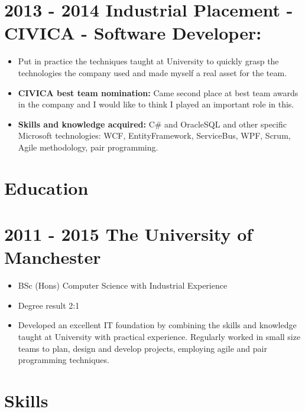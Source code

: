 \documentclass[12pt,a4paper]{res}
\begin{document}
\begin{resume}
\section{\bf 2013 - 2014 \hspace{0.5mm} Industrial Placement - CIVICA - Software Developer:}
\vspace{5mm}    
	\begin{itemize}
	\item[] Put in practice the techniques taught at University to quickly grasp the technologies the company used and made myself a real asset for the team.
	\item{\bf CIVICA best team nomination:} Came second place at best team awards in the company and I would like to think I played an important role in this.
	\item{\bf Skills and knowledge acquired:} C\# and OracleSQL and other specific Microsoft technologies: WCF, EntityFramework, ServiceBus, WPF, Scrum, Agile methodology, pair programming.
	\end{itemize}


\section{\large\bf Education}
\vspace{5mm}

\section{\bf 2011 - 2015 \hspace{1.5mm}The University of Manchester}
  
  \begin{itemize} %
     \item[] BSc (Hons) Computer Science  with Industrial Experience
     \item[] Degree result 2:1

     \item Developed an excellent IT foundation by combining the skills and knowledge taught at University with practical experience. Regularly worked in small size teams to plan, design and develop projects, employing agile and pair programming techniques.
   \end{itemize}

\newpage 
	
\section{\large\bf Skills}
\vspace{2mm}

\end{resume}
\end{document}
